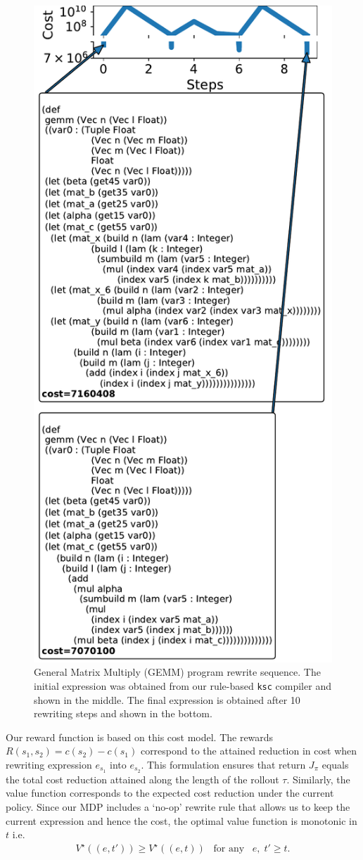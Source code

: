 \documentclass[fullpage,twocolumn]{article} %
\begin{document}
%
\begin{figure}
    \centering
    \vspace*{-2mm}
    \includegraphics[width=.35\textwidth]{cost_sequence_blas.pdf}
    \caption{General Matrix Multiply (GEMM) program rewrite sequence. The initial expression was obtained from our rule-based \texttt{ksc} compiler and shown in the middle. The final expression is obtained after 10 rewriting steps and shown in the bottom.}
    \label{gemm-qualit}
\end{figure}
%



Our reward function is based on this cost model. The rewards $R(s_1, s_2) = c(s_2) - c(s_1)$ correspond to the attained reduction in cost when rewriting expression $e_{s_1}$ into $e_{s_2}$. This formulation ensures that return $J_\pi$ equals the total cost reduction attained along the length of the rollout $\tau$. Similarly, the value function corresponds to the expected cost reduction under the current policy. Since our MDP includes a `no-op' rewrite rule that allows us to keep the current expression and hence the cost, the optimal value function is monotonic in $t$ i.e. 
\begin{gather}
\label{v-monotonic}
V^\star((e, t')) \geq V^\star((e, t))  \;\;\; \text{for any} \;\;\; e,\; t' \geq t.
\end{gather}

\end{document}
